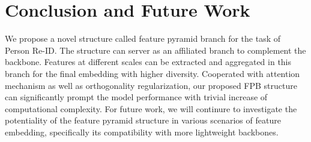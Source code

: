 \documentclass[journal]{IEEEtran}
\begin{document}
\section{Conclusion and Future Work}\label{sec:conclusion-and-future-work}
We propose a novel structure called feature pyramid branch for the task of Person Re-ID.
The structure can server as an affiliated branch to complement the backbone.
Features at different scales can be extracted and aggregated in this branch for the final embedding with higher diversity.
Cooperated with attention mechanism as well as orthogonality regularization, our proposed FPB structure can significantly prompt the model performance with trivial increase of computational complexity.
For future work, we will continure to investigate the potentiality of the feature pyramid structure in various scenarios of feature embedding, specifically its compatibility with more lightweight backbones.




































\ifCLASSOPTIONcaptionsoff
  \newpage
\fi









\end{document}
